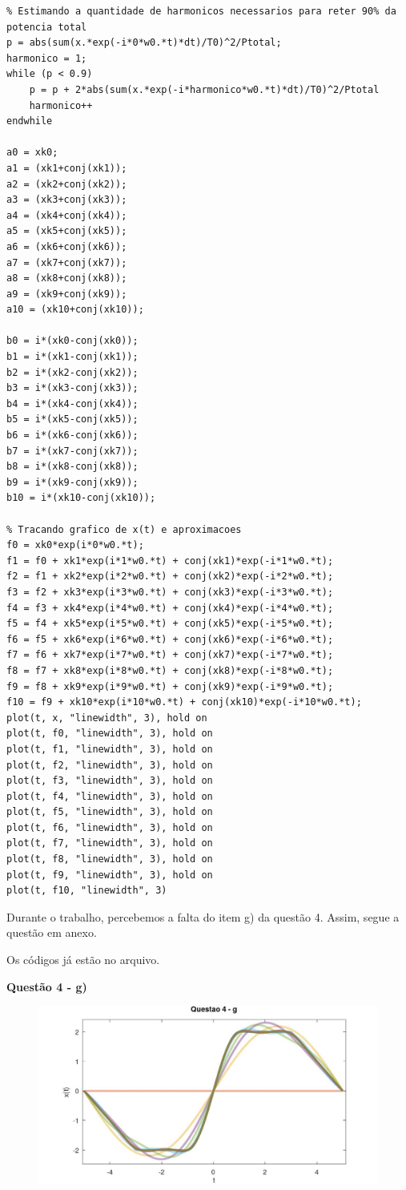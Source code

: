 \documentclass{article}
\begin{document}
\begin{verbatim}
% Estimando a quantidade de harmonicos necessarios para reter 90% da potencia total
p = abs(sum(x.*exp(-i*0*w0.*t)*dt)/T0)^2/Ptotal;
harmonico = 1;
while (p < 0.9)
    p = p + 2*abs(sum(x.*exp(-i*harmonico*w0.*t)*dt)/T0)^2/Ptotal
    harmonico++
endwhile

a0 = xk0;
a1 = (xk1+conj(xk1));
a2 = (xk2+conj(xk2));
a3 = (xk3+conj(xk3));
a4 = (xk4+conj(xk4));
a5 = (xk5+conj(xk5));
a6 = (xk6+conj(xk6));
a7 = (xk7+conj(xk7));
a8 = (xk8+conj(xk8));
a9 = (xk9+conj(xk9));
a10 = (xk10+conj(xk10));

b0 = i*(xk0-conj(xk0));
b1 = i*(xk1-conj(xk1));
b2 = i*(xk2-conj(xk2));
b3 = i*(xk3-conj(xk3));
b4 = i*(xk4-conj(xk4));
b5 = i*(xk5-conj(xk5));
b6 = i*(xk6-conj(xk6));
b7 = i*(xk7-conj(xk7));
b8 = i*(xk8-conj(xk8));
b9 = i*(xk9-conj(xk9));
b10 = i*(xk10-conj(xk10));

% Tracando grafico de x(t) e aproximacoes
f0 = xk0*exp(i*0*w0.*t);
f1 = f0 + xk1*exp(i*1*w0.*t) + conj(xk1)*exp(-i*1*w0.*t);
f2 = f1 + xk2*exp(i*2*w0.*t) + conj(xk2)*exp(-i*2*w0.*t);
f3 = f2 + xk3*exp(i*3*w0.*t) + conj(xk3)*exp(-i*3*w0.*t);
f4 = f3 + xk4*exp(i*4*w0.*t) + conj(xk4)*exp(-i*4*w0.*t);
f5 = f4 + xk5*exp(i*5*w0.*t) + conj(xk5)*exp(-i*5*w0.*t);
f6 = f5 + xk6*exp(i*6*w0.*t) + conj(xk6)*exp(-i*6*w0.*t);
f7 = f6 + xk7*exp(i*7*w0.*t) + conj(xk7)*exp(-i*7*w0.*t);
f8 = f7 + xk8*exp(i*8*w0.*t) + conj(xk8)*exp(-i*8*w0.*t);
f9 = f8 + xk9*exp(i*9*w0.*t) + conj(xk9)*exp(-i*9*w0.*t);
f10 = f9 + xk10*exp(i*10*w0.*t) + conj(xk10)*exp(-i*10*w0.*t);
plot(t, x, "linewidth", 3), hold on
plot(t, f0, "linewidth", 3), hold on
plot(t, f1, "linewidth", 3), hold on
plot(t, f2, "linewidth", 3), hold on
plot(t, f3, "linewidth", 3), hold on
plot(t, f4, "linewidth", 3), hold on
plot(t, f5, "linewidth", 3), hold on
plot(t, f6, "linewidth", 3), hold on
plot(t, f7, "linewidth", 3), hold on
plot(t, f8, "linewidth", 3), hold on
plot(t, f9, "linewidth", 3), hold on
plot(t, f10, "linewidth", 3)
\end{verbatim}

\newpage

Durante o trabalho, percebemos a falta do item g) da questão 4. Assim, segue a questão em anexo.

Os códigos já estão no arquivo.

\textbf{Questão 4 - g)}
\begin{figure}[h!]
    \includegraphics[scale=0.5]{plot4g}
\end{figure}
\end{document}
